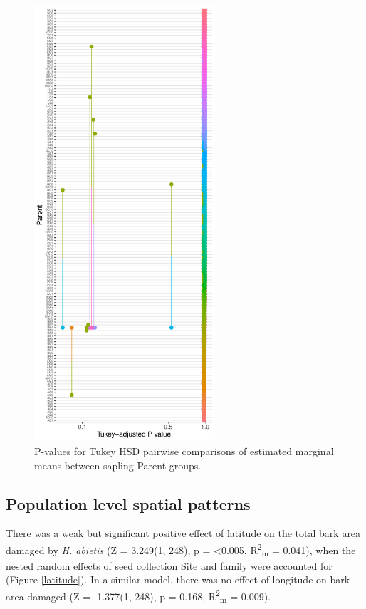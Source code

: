 \documentclass[a4paper, 11pt]{article}
\begin{document}
\begin{figure}[H]
\centering
	\includegraphics[width=0.6\textwidth]{margin_lmer_family}
	\caption{P-values for Tukey HSD pairwise comparisons of estimated marginal means between sapling Parent groups.}
	\label{lmer_margin_family}
\end{figure}



\subsection*{Population level spatial patterns}

There was a weak but significant positive effect of latitude on the total bark area damaged by \textit{H. abietis} (Z = 3.249(1, 248), p =  \textless{}0.005, R\textsuperscript{2}\textsubscript{m} = 0.041), when the nested random effects of seed collection Site and family were accounted for (Figure \ref{latitude}). In a similar model, there was no effect of longitude on bark area damaged (Z = -1.377(1, 248), p = 0.168, R\textsuperscript{2}\textsubscript{m} = 0.009).  
\end{document}
